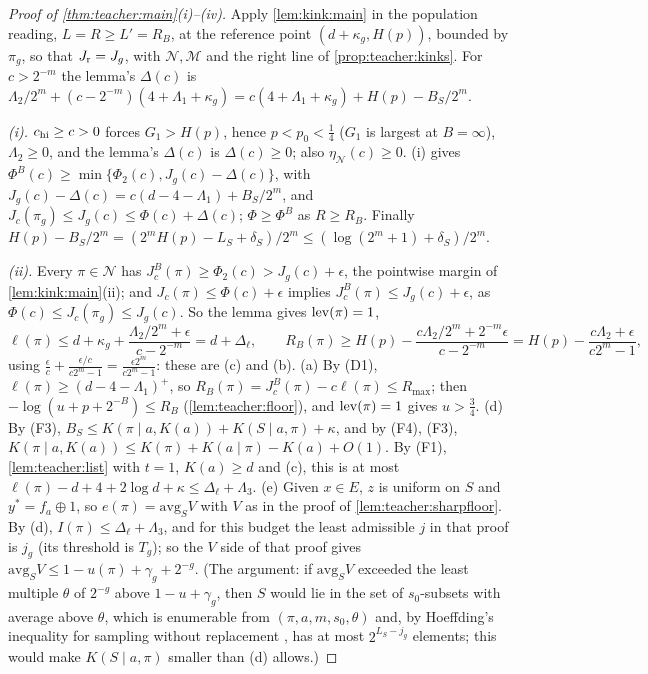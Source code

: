 \begin{proof}[Proof of \cref{thm:teacher:main}(i)--(iv)]
Apply \cref{lem:kink:main} in the population reading, $L=R\ge L'=R_B$, at the reference point $(d+\kappa_g,H(p))$, bounded by $\pi_g$, so that $J_{\rm r}=J_g$, with $\mathcal N,\mathcal M$ and the right line of \cref{prop:teacher:kinks}. For $c>2^{-m}$ the lemma's $\Delta(c)$ is $\Lambda_2/2^m+(c-2^{-m})(4+\Lambda_1+\kappa_g)=c(4+\Lambda_1+\kappa_g)+H(p)-B_S/2^m$.

\emph{(i).} $c_{\rm hi}\ge c>0$ forces $G_1>H(p)$, hence $p<p_0<\frac14$ ($G_1$ is largest at $B=\infty$), $\Lambda_2\ge0$, and the lemma's $\Delta(c)$ is $\Delta(c)\ge0$; also $\eta_{\mathcal N}(c)\ge0$. (i) gives $\Phi^B(c)\ge\min\{\Phi_2(c),J_g(c)-\Delta(c)\}$, with $J_g(c)-\Delta(c)=c(d-4-\Lambda_1)+B_S/2^m$, and $J_c(\pi_g)\le J_g(c)\le\Phi(c)+\Delta(c)$; $\Phi\ge\Phi^B$ as $R\ge R_B$. Finally $H(p)-B_S/2^m=(2^mH(p)-L_S+\delta_S)/2^m\le(\log(2^m+1)+\delta_S)/2^m$.

\emph{(ii).} Every $\pi\in\mathcal N$ has $J^B_c(\pi)\ge\Phi_2(c)>J_g(c)+\epsilon$, the pointwise margin of \cref{lem:kink:main}(ii); and $J_c(\pi)\le\Phi(c)+\epsilon$ implies $J^B_c(\pi)\le J_g(c)+\epsilon$, as $\Phi(c)\le J_c(\pi_g)\le J_g(c)$. So the lemma gives $\operatorname{lev}(\pi)=1$,
\[
\ell(\pi)\le d+\kappa_g+\frac{\Lambda_2/2^m+\epsilon}{c-2^{-m}}=d+\Delta_\ell,\qquad R_B(\pi)\ge H(p)-\frac{c\Lambda_2/2^m+2^{-m}\epsilon}{c-2^{-m}}=H(p)-\frac{c\Lambda_2+\epsilon}{c2^m-1},
\]
using $\frac\epsilon c+\frac{\epsilon/c}{c2^m-1}=\frac{\epsilon2^m}{c2^m-1}$: these are (c) and (b).
(a) By (D1), $\ell(\pi)\ge(d-4-\Lambda_1)^+$, so $R_B(\pi)=J^B_c(\pi)-c\ell(\pi)\le R_{\max}$; then $-\log(u+p+2^{-B})\le R_B$ (\cref{lem:teacher:floor}), and $\operatorname{lev}(\pi)=1$ gives $u>\frac34$.
(d) By (F3), $B_S\le K(\pi\mid a,K(a))+K(S\mid a,\pi)+\kappa$, and by (F4), (F3), $K(\pi\mid a,K(a))\le K(\pi)+K(a\mid\pi)-K(a)+O(1)$. By (F1), \cref{lem:teacher:list} with $t=1$, $K(a)\ge d$ and (c), this is at most $\ell(\pi)-d+4+2\log d+\kappa\le\Delta_\ell+\Lambda_3$.
(e) Given $x\in E$, $z$ is uniform on $S$ and $y^*=f_a\oplus1$, so $e(\pi)=\mathrm{avg}_SV$ with $V$ as in the proof of \cref{lem:teacher:sharpfloor}. By (d), $I(\pi)\le\Delta_\ell+\Lambda_3$, and for this budget the least admissible $j$ in that proof is $j_g$ (its threshold is $T_g$); so the $V$ side of that proof gives $\mathrm{avg}_SV\le1-u(\pi)+\gamma_g+2^{-g}$. (The argument: if $\mathrm{avg}_SV$ exceeded the least multiple $\theta$ of $2^{-g}$ above $1-u+\gamma_g$, then $S$ would lie in the set of $s_0$-subsets with average above $\theta$, which is enumerable from $(\pi,a,m,s_0,\theta)$ and, by Hoeffding's inequality for sampling without replacement \citep{hoeffding1963probability}, has at most $2^{L_S-j_g}$ elements; this would make $K(S\mid a,\pi)$ smaller than (d) allows.)


\end{proof}
